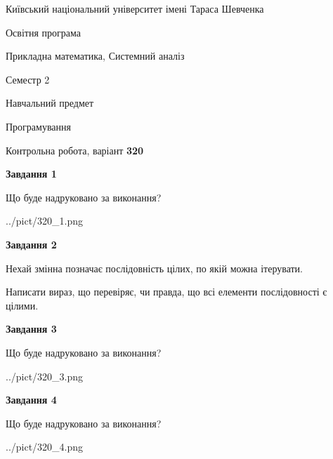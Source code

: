 \documentclass[12pt, ukrainian]{article}
\begin{document}
{{\begin {small}\par
{ \center  Київський національний університет імені Тараса Шевченка \par}
{\parbox {5 cm}{Освітня програма \hfill}{\parbox {8 cm}{Прикладна математика, Системний аналіз \hfill}}\parbox {5 cm}{\hfill Семестр 2}}\par
{\parbox {5 cm} {Навчальний предмет \hfill}\parbox {7 cm}{Програмування \hfill}\parbox {6cm}{\hfill}\par}\vspace{-7pt} \end{small}}{\center Контрольна робота, варіант  \No \textbf
{ 320 }\par}}
{
\begin {large}
{\begin {center}\textbf{Завдання 1}\end {center}}\par
Що буде надруковано за виконання?\par\par
\begin{center}
	{../pict/320_1.png}
\end{center}
\newpage

{\begin {center}\textbf{Завдання 2}\end {center}}\par
Нехай змінна  позначає послідовність цілих, по якій можна ітерувати.

Написати вираз, що перевіряє, чи правда, що всі елементи послідовності є цілими.\par
\newpage

{\begin {center}\textbf{Завдання 3}\end {center}}\par
Що буде надруковано за виконання?
\begin{center}
	{../pict/320_3.png}
\end{center}
\newpage

{\begin {center}\textbf{Завдання 4}\end {center}}\par
Що буде надруковано за виконання?\par
\begin{center}
	{../pict/320_4.png}
\end{center}
\newpage


\end{large}}
\end{document}
